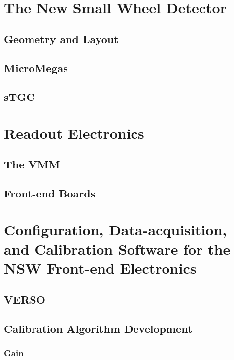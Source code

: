 


\section{The New Small Wheel Detector}
\subsection{Geometry and Layout}
\subsection{MicroMegas}
\subsection{sTGC}
\section{Readout Electronics}
\subsection{The VMM}
\subsection{Front-end Boards}

\section{Configuration, Data-acquisition, and Calibration Software for the NSW Front-end Electronics}
\subsection{VERSO}
\subsection{Calibration Algorithm Development}
\subsubsection{Gain}
